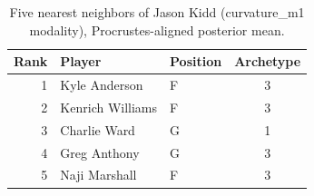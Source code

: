 \begin{table}[htbp]
  \centering\small
  \begin{tabular}{rllc}
    \toprule
    Rank & Player & Position & Archetype \\
    \midrule
    1 & Kyle Anderson & F & 3 \\
    2 & Kenrich Williams & F & 3 \\
    3 & Charlie Ward & G & 1 \\
    4 & Greg Anthony & G & 3 \\
    5 & Naji Marshall & F & 3 \\
    \bottomrule
  \end{tabular}
  \caption{Five nearest neighbors of Jason Kidd (curvature_m1 modality), Procrustes-aligned posterior mean.}
  \label{tab:Jason_Kidd_neighbors_curvature_m1}
\end{table}

